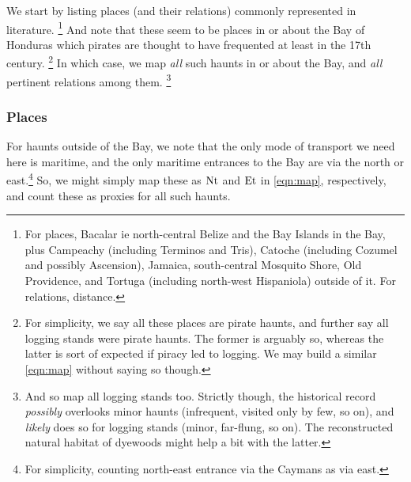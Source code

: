 		We start by listing places (and their relations) commonly represented in literature.%
		\footnote{For places, Bacalar ie north-central Belize and the Bay Islands in the Bay, plus Campeachy (including Terminos and Tris), Catoche (including Cozumel and possibly Ascension), Jamaica, south-central Mosquito Shore, Old Providence, and Tortuga (including north-west Hispaniola) outside of it. For relations, distance.}
		And note that these seem to be places in or about the Bay of Honduras which pirates are thought to have frequented at least in the 17th century.%
		\footnote{For simplicity, we say all these places are pirate haunts, and further say all logging stands were pirate haunts. The former is arguably so, whereas the latter is sort of expected if piracy led to logging. We may build a similar \ref{eqn:map} without saying so though.}
		In which case, we map \emph{all} such haunts in or about the Bay, and \emph{all} pertinent relations among them.%
		\footnote{And so map all logging stands too. Strictly though, the historical record \emph{possibly} overlooks minor haunts (infrequent, visited only by few, so on), and \emph{likely} does so for logging stands (minor, far-flung, so on). The reconstructed natural habitat of dyewoods might help a bit with the latter.}
	
		\subsubsection{Places}
		For haunts outside of the Bay, we note that the only mode of transport we need here is maritime, and the only maritime entrances to the Bay are via the north or east.\footnote{For simplicity, counting north-east entrance via the Caymans as via east.} So, we might simply map these as \(\operatorname{Nt}\) and \(\operatorname{Et}\) in \ref{eqn:map}, respectively, and count these as proxies for all such haunts.
	
